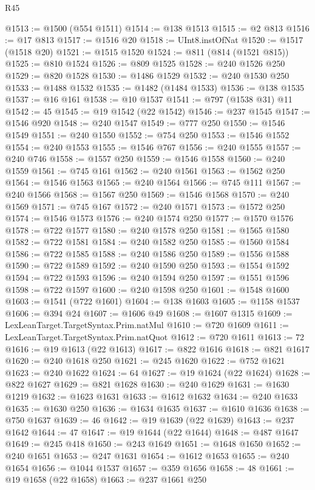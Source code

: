 \begin{lexlean}{R45}
\begin{coremodule}
@1513 := @1500 (@554 @1511)
@1514 := @138 @1513
@1515 := @2 @813
@1516 := @17 @813
@1517 := @1516 @20
@1518 := UInt8.instOfNat
@1520 := @1517 (@1518 @20)
@1521 := @1515 @1520
@1524 := @811 (@814 (@1521 @815))
@1525 := @810 @1524
@1526 := @809 @1525
@1528 := @240 @1526 @250
@1529 := @820 @1528
@1530 := @1486 @1529
@1532 := @240 @1530 @250
@1533 := @1488 @1532
@1535 := @1482 (@1484 @1533)
@1536 := @138 @1535
@1537 := @16 @161
@1538 := @10 @1537
@1541 := @797 (@1538 @31) @11
@1542 := 45
@1545 := @19 @1542 (@22 @1542)
@1546 := @237 @1545
@1547 := @1546 @920
@1548 := @240 @1547
@1549 := @777 @250
@1550 := @1546 @1549
@1551 := @240 @1550
@1552 := @754 @250
@1553 := @1546 @1552
@1554 := @240 @1553
@1555 := @1546 @767
@1556 := @240 @1555
@1557 := @240 @746
@1558 := @1557 @250
@1559 := @1546 @1558
@1560 := @240 @1559
@1561 := @745 @161
@1562 := @240 @1561
@1563 := @1562 @250
@1564 := @1546 @1563
@1565 := @240 @1564
@1566 := @745 @111
@1567 := @240 @1566
@1568 := @1567 @250
@1569 := @1546 @1568
@1570 := @240 @1569
@1571 := @745 @167
@1572 := @240 @1571
@1573 := @1572 @250
@1574 := @1546 @1573
@1576 := @240 @1574 @250
@1577 := @1570 @1576
@1578 := @722 @1577
@1580 := @240 @1578 @250
@1581 := @1565 @1580
@1582 := @722 @1581
@1584 := @240 @1582 @250
@1585 := @1560 @1584
@1586 := @722 @1585
@1588 := @240 @1586 @250
@1589 := @1556 @1588
@1590 := @722 @1589
@1592 := @240 @1590 @250
@1593 := @1554 @1592
@1594 := @722 @1593
@1596 := @240 @1594 @250
@1597 := @1551 @1596
@1598 := @722 @1597
@1600 := @240 @1598 @250
@1601 := @1548 @1600
@1603 := @1541 (@722 @1601)
@1604 := @138 @1603
@1605 := @1158 @1537
@1606 := @394 @24
@1607 := @1606 @49
@1608 := @1607 @1315
@1609 := LexLeanTarget.TargetSyntax.Prim.natMul
@1610 := @720 @1609
@1611 := LexLeanTarget.TargetSyntax.Prim.natQuot
@1612 := @720 @1611
@1613 := 72
@1616 := @19 @1613 (@22 @1613)
@1617 := @822 @1616
@1618 := @821 @1617
@1620 := @240 @1618 @250
@1621 := @245 @1620
@1622 := @752 @1621
@1623 := @240 @1622
@1624 := 64
@1627 := @19 @1624 (@22 @1624)
@1628 := @822 @1627
@1629 := @821 @1628
@1630 := @240 @1629
@1631 := @1630 @1219
@1632 := @1623 @1631
@1633 := @1612 @1632
@1634 := @240 @1633
@1635 := @1630 @250
@1636 := @1634 @1635
@1637 := @1610 @1636
@1638 := @750 @1637
@1639 := 46
@1642 := @19 @1639 (@22 @1639)
@1643 := @237 @1642
@1644 := 47
@1647 := @19 @1644 (@22 @1644)
@1648 := @487 @1647
@1649 := @245 @418
@1650 := @243 @1649
@1651 := @1648 @1650
@1652 := @240 @1651
@1653 := @247 @1631
@1654 := @1612 @1653
@1655 := @240 @1654
@1656 := @1044 @1537
@1657 := @359 @1656
@1658 := 48
@1661 := @19 @1658 (@22 @1658)
@1663 := @237 @1661 @250

\end{coremodule}
\end{lexlean}
